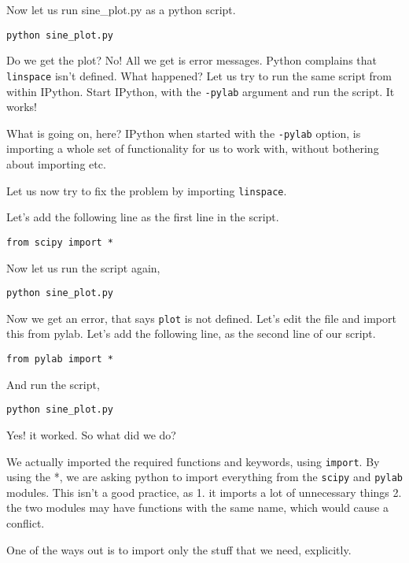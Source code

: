 \documentclass[presentation]{beamer}
\begin{document}
Now let us run sine\_plot.py as a python script.

\begin{verbatim}
python sine_plot.py
\end{verbatim}

Do we get the plot? No! All we get is error messages. Python complains
that \texttt{linspace} isn't defined. What happened? Let us try to run the same
script from within IPython. Start IPython, with the \texttt{-pylab} argument
and run the script. It works!

What is going on, here? IPython when started with the \texttt{-pylab} option,
is importing a whole set of functionality for us to work with, without
bothering about importing etc.

Let us now try to fix the problem by importing \texttt{linspace}.

Let's add the following line as the first line in the script.

\begin{verbatim}
from scipy import *
\end{verbatim}

Now let us run the script again,

\begin{verbatim}
python sine_plot.py
\end{verbatim}

Now we get an error, that says \texttt{plot} is not defined. Let's edit the
file and import this from pylab. Let's add the following line, as the
second line of our script.

\begin{verbatim}
from pylab import *
\end{verbatim}

And run the script,

\begin{verbatim}
python sine_plot.py
\end{verbatim}

Yes! it worked. So what did we do?

We actually imported the required functions and keywords, using
\texttt{import}. By using the *, we are asking python to import everything from
the \texttt{scipy} and \texttt{pylab} modules. This isn't a good practice, as 1. it
imports a lot of unnecessary things 2. the two modules may have
functions with the same name, which would cause a conflict.

One of the ways out is to import only the stuff that we need,
explicitly.
\end{document}
